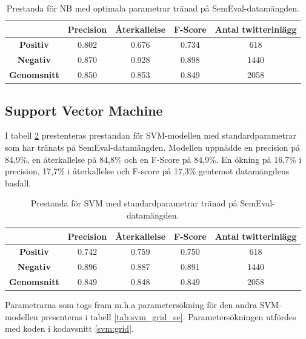 \documentclass{kaumasters} %
\begin{document}
\begin{table}[H]
\centering
\caption{Prestanda för NB med optimala parametrar tränad på SemEval-datamängden.}
\label{tab:nb_imp_se}
    \begin{tabular}{ccccc}
    \toprule
     & \textbf{Precision} & \textbf{Återkallelse} & \textbf{F-Score} & \textbf{Antal twitterinlägg}  \\
    \midrule
    \textbf{Positiv} & 0.802 & 0.676 & 0.734 & 618 \\
    \textbf{Negativ} & 0.870 & 0.928 & 0.898 & 1440 \\
    \midrule
    \textbf{Genomsnitt} & 0.850 & 0.853 & 0.849  & 2058 \\
    \bottomrule
\end{tabular}
\end{table}

\subsection{Support Vector Machine}
I tabell \ref{tab:svm_base_se} prestenteras prestandan för SVM-modellen med standardparametrar som har tränats på SemEval-datamängden. Modellen uppnådde en precision på 84,9\%, en återkallelse på 84,8\% och en F-Score på 84,9\%. En ökning på 16,7\% i precision, 17,7\% i återkallelse och F-score på 17,3\% gentemot datamängdens basfall.

\begin{table}[H]
\centering
\caption{Prestanda för SVM med standardparametrar tränad på SemEval-datamängden.}
\label{tab:svm_base_se}
    \begin{tabular}{ccccc}
    \toprule
     & \textbf{Precision} & \textbf{Återkallelse} & \textbf{F-Score} & \textbf{Antal twitterinlägg}  \\
    \midrule
    \textbf{Positiv} & 0.742 & 0.759 & 0.750 & 618 \\
    \textbf{Negativ} & 0.896 & 0.887 & 0.891 & 1440 \\
    \midrule
    \textbf{Genomsnitt} & 0.849 & 0.848 & 0.849  & 2058 \\
    \bottomrule
\end{tabular}
\end{table}

Parametrarna som togs fram m.h.a parametersökning för den andra SVM-modellen presenteras i tabell \ref{tab:svm_grid_se}. Parametersökningen utfördes med koden i kodavsnitt \ref{svm:grid}. 
\end{document}
